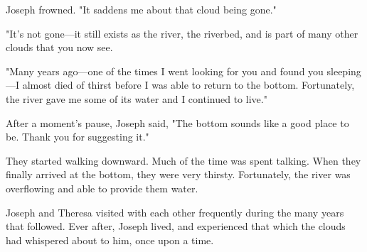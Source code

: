 Joseph frowned. "It saddens me about that cloud being gone."

"It's not gone—it still exists as the river, the riverbed, and is part of many other clouds that you now see.

"Many years ago—one of the times I went looking for you and found you sleeping—I almost died of thirst before I was able to return to the bottom. Fortunately, the river gave me some of its water and I continued to live."

After a moment's pause, Joseph said, "The bottom sounds like a good place to be. Thank you for suggesting it."

They started walking downward. Much of the time was spent talking. When they finally arrived at the bottom, they were very thirsty. Fortunately, the river was overflowing and able to provide them water.

Joseph and Theresa visited with each other frequently during the many years that followed. Ever after, Joseph lived, and experienced that which the clouds had whispered about to him, once upon a time.